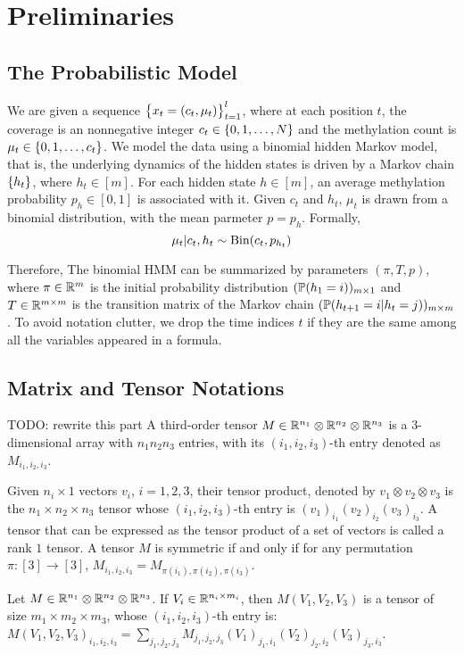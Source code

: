 \section{Preliminaries}

\subsection{The Probabilistic Model}

We are given a sequence $\cbr{x_t = (c_t, \mu_t)}_{t=1}^l$, where at each position $t$, the coverage is an nonnegative integer $c_t \in \cbr{0,1,\ldots,N}$ and the methylation count is $\mu_t \in \cbr{0,1,\ldots,c_t}$. We model the data using a binomial hidden Markov model, that is, the underlying dynamics of the hidden states is driven by a Markov chain $\cbr{h_t}$, where $h_t \in [m]$. For each hidden state $h \in [m]$, an average methylation probability $p_h \in [0,1]$ is associated with it.
Given $c_t$ and $h_t$, $\mu_t$ is drawn from a binomial distribution, with the mean parmeter $p = p_h$.
Formally,
\[ \mu_t | c_t, h_t \sim \bin(c_t, p_{h_t}) \]

Therefore, The binomial HMM can be summarized by parameters $(\pi, T, p)$, where $\pi \in \R^m$ is the initial probability distribution $(\P(h_1 = i))_{m \times 1}$ and $T \in \R^{m \times m}$ is the transition matrix of the Markov chain $(\P(h_{t+1} = i | h_t = j))_{m \times m}$. To avoid notation clutter, we drop the time indices $t$ if they are the same among all the variables appeared in a formula.

\subsection{Matrix and Tensor Notations}
TODO: rewrite this part
A third-order tensor $M \in \R^{n_1} \otimes \R^{n_2} \otimes \R^{n_3}$ is a $3$-dimensional array with $n_1 n_2 n_3$ entries, with its $(i_1, i_2, i_3)$-th entry denoted as $M_{i_1, i_2, i_3}$.

Given $n_i \times 1$ vectors $v_i$, $i = 1, 2, 3$, their tensor product, denoted by $v_1 \otimes v_2 \otimes v_3$ is the $n_1 \times n_2 \times n_3$ tensor whose $(i_1, i_2, i_3)$-th entry is $(v_1)_{i_1} (v_2)_{i_2} (v_3)_{i_3}$. A tensor that can be expressed as the tensor product of a set of vectors is called a rank $1$ tensor. A tensor $M$ is symmetric if and only if for any permutation $\pi: [3] \to [3]$, $M_{i_1, i_2, i_3} = M_{\pi(i_1), \pi(i_2), \pi(i_3)}$.

Let $M \in \R^{n_1} \otimes \R^{n_2} \otimes \R^{n_3}$. If $V_i \in \R^{n_i \times m_i}$, then $M(V_1, V_2, V_3)$ is a tensor of size $m_1 \times m_2 \times m_3$, whose $(i_1, i_2, i_3)$-th entry is: $M(V_1, V_2, V_3)_{i_1, i_2, i_3} = \sum_{j_1, j_2, j_3} M_{j_1, j_2, j_3} (V_1)_{j_1,i_1} (V_2)_{j_2, i_2} (V_3)_{j_3,i_3}$.


